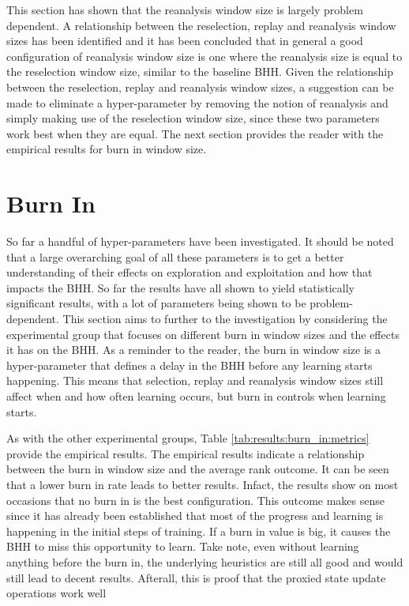 This section has shown that the reanalysis window size is largely problem dependent. A relationship between the reselection, replay and reanalysis window sizes has been identified and it has been concluded that in general a good configuration of reanalysis window size is one where the reanalysis size is equal to the reselection window size, similar to the baseline \Ac{BHH}. Given the relationship between the reselection, replay and reanalysis window sizes, a suggestion can be made to eliminate a hyper-parameter by removing the notion of reanalysis and simply making use of the  reselection window size, since these two parameters work best when they are equal. The next section provides the reader with the empirical results for burn in window size.



\section{Burn In}
\label{sec:results:burn_in}

So far a handful of hyper-parameters have been investigated. It should be noted that a large overarching goal of all these parameters is to get a better understanding of their effects on exploration and exploitation and how that impacts the \Ac{BHH}. So far the results have all shown to yield statistically significant results, with a lot of parameters being shown to be problem-dependent. This section aims to further to the investigation by considering the experimental group that focuses on different burn in window sizes and the effects it has on the \Ac{BHH}. As a reminder to the reader, the burn in window size is a hyper-parameter that defines a delay in the \Ac{BHH} before any learning starts happening. This means that selection, replay and reanalysis window sizes still affect when and how often learning occurs, but burn in controls when learning starts.

As with the other experimental groups, Table \ref{tab:results:burn_in:metrics} provide the empirical results. The empirical results indicate a relationship between the burn in window size and the average rank outcome. It can be seen that a lower burn in rate leads to better results. Infact, the results show on most occasions that no burn in is the best configuration. This outcome makes sense since it has already been established that most of the progress and learning is happening in the initial steps of training. If a burn in value is big, it causes the \Ac{BHH} to miss this opportunity to learn. Take note, even without learning anything before the burn in, the underlying heuristics are still all good and would still lead to decent results. Afterall, this is proof that the proxied state update operations work well


